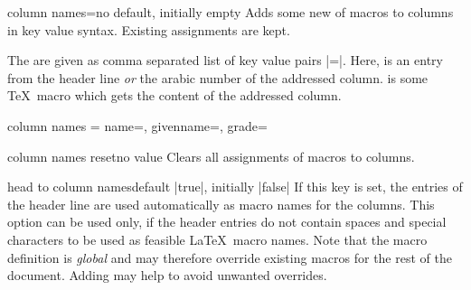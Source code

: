 \documentclass[a4paper,11pt]{ltxdoc}
\begin{document}
\begin{docCsvKey}{column names}{=}{no default, initially empty}
  Adds some new  of macros to columns in key value syntax.
  Existing assignments are kept.\par
  The  are given as comma separated list of key value pairs
  \mbox{|=|}. Here,  is an entry from the
  header line \emph{or} the arabic number of the addressed column.
   is some \TeX\ macro which gets the content of the addressed column.
\begin{dispListing}
  column names = {name=\surname, givenname=\firstname, grade=\grade}
\end{dispListing}
\end{docCsvKey}


\begin{docCsvKey}{column names reset}{}{no value}
  Clears all assignments of macros to columns.
\end{docCsvKey}


\begin{docCsvKey}{head to column names}{}{default |true|, initially |false|}
  If this key is set, the entries of the header line are used automatically
  as macro names for the columns. This option can be used only, if
  the header entries do not contain spaces and special characters to be
  used as feasible \LaTeX\ macro names.
  Note that the macro definition is \emph{global} and may therefore override
  existing macros for the rest of the document. Adding
   may help to avoid unwanted
  overrides.
\end{docCsvKey}


\end{document}
